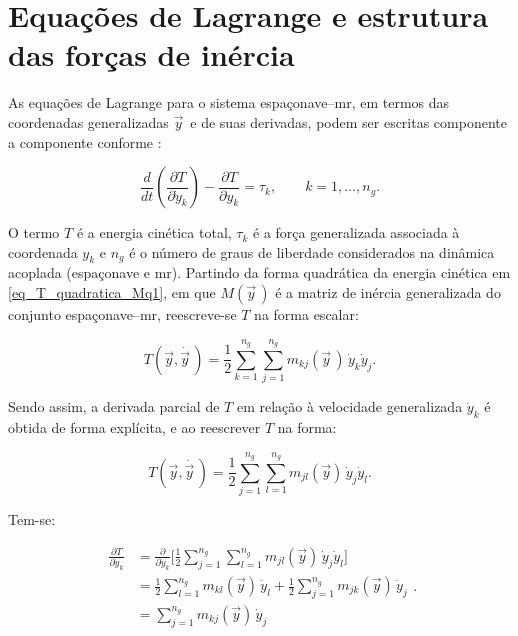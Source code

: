 \section{Equações de Lagrange e estrutura das forças de inércia}
\label{sec_dinAcoplada_equacoes_Lagrange}


As equações de Lagrange para o sistema espaçonave--\gls{mr}, em termos das coordenadas generalizadas $\vec y\,$ e de suas derivadas, podem ser escritas componente a componente conforme \cite{Wilde2018}:

\begin{equation}
\frac{d}{dt}\!\left(\frac{\partial T}{\partial \dot y_k}\right)
-\frac{\partial T}{\partial y_k}
=
\tau_k,
\qquad
k = 1,\dots,n_g.
\label{eq_lagrange_componentes}
\end{equation}

O termo $T$ é a energia cinética total, $\tau_k$ é a força generalizada associada à coordenada $y_k$ e $n_g$ é o número de graus de liberdade considerados na dinâmica acoplada (espaçonave e \gls{mr}).
Partindo da forma quadrática da energia cinética em \eqref{eq_T_quadratica_Mq1},
em que $M(\vec y\,)$ é a matriz de inércia generalizada do conjunto espaçonave--\gls{mr},
reescreve-se $T$ na forma escalar:

\begin{equation}
T(\vec y,\dot{\vec y\, })
=
\frac{1}{2}
\sum_{k=1}^{n_g}\sum_{j=1}^{n_g}
m_{kj}(\vec y\, )\,\dot y_k \dot y_j.
\label{eq_T_expandida_mkj}
\end{equation}


Sendo assim, a derivada parcial de $T$ em relação à velocidade generalizada
$\dot y_k$ é obtida de forma explícita, e ao reescrever $T$ na forma:

\begin{equation}
T(\vec y,\dot{\vec y\, })
=
\frac{1}{2}
\sum_{j=1}^{n_g}\sum_{l=1}^{n_g}
m_{jl}(\vec y)\,\dot y_j \dot y_l.
\end{equation}

Tem-se:

\begin{equation}
\begin{aligned}
\frac{\partial T}{\partial \dot y_k}
&=
\frac{\partial}{\partial \dot y_k}
\biggl[
\frac{1}{2}
\sum_{j=1}^{n_g}\sum_{l=1}^{n_g}
m_{jl}(\vec y)\,\dot y_j \dot y_l
\biggr]
\\
&=
\frac{1}{2}
\sum_{l=1}^{n_g}
m_{kl}(\vec y)\,\dot y_l
+
\frac{1}{2}
\sum_{j=1}^{n_g}
m_{jk}(\vec y)\,\dot y_j
\\
&=
\sum_{j=1}^{n_g}
m_{kj}(\vec y)\,\dot y_j
\end{aligned}.
\label{eq_dT_dqdot_intermediaria}
\end{equation}

